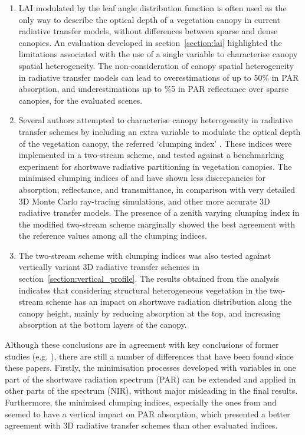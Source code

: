\documentclass[a4paper,11pt]{report}
\begin{document}
\begin{enumerate}
\item LAI modulated by the leaf angle distribution function is often used as the only way to describe the optical depth of a vegetation canopy in current radiative transfer models, without differences between sparse and dense canopies. An evaluation developed in section~\ref{section:lai} highlighted the limitations associated with the use of a single variable to characterise canopy spatial heterogeneity. The non-consideration of canopy spatial heterogeneity in radiative transfer models can lead to overestimations of up to 50\% in PAR absorption, and underestimations up to \%5 in PAR reflectance over sparse canopies, for the evaluated scenes.
\item Several authors attempted to characterise canopy heterogeneity in radiative transfer schemes by including an extra variable to modulate the optical depth of the vegetation canopy, the referred `clumping index' \citep{Nilson1971,Kucharik1999,pinty2006,Ni-Meister2010}. These indices were implemented in a two-stream scheme, and tested against a benchmarking experiment for shortwave radiative partitioning in vegetation canopies. The minimised clumping indices of \citet{Nilson1971} and \citet{pinty2006} have shown less discrepancies for absorption, reflectance, and transmittance, in comparison with very detailed 3D Monte Carlo ray-tracing simulations, and other more accurate 3D radiative transfer models. The presence of a zenith varying clumping index in the modified two-stream scheme marginally showed the best agreement with the reference values among all the clumping indices.
\item The two-stream scheme with clumping indices was also tested against vertically variant 3D radiative transfer schemes in section~\ref{section:vertical_profile}. The results obtained from the analysis indicates that considering structural heterogeneous vegetation in the two-stream scheme has an impact on shortwave radiation distribution along the canopy height, mainly by reducing absorption at the top, and increasing absorption at the bottom layers of the canopy.
\end{enumerate} 

Although these conclusions are in agreement with key conclusions of former studies (e.g. \citet{pinty2006,loew2014}), there are still a number of differences that have been found since these papers. Firstly, the minimisation processes developed with variables in one part of the shortwave radiation spectrum (PAR) can be extended and applied in other parts of the spectrum (NIR), without major misleading in the final results. Furthermore, the minimised clumping indices, especially the ones from \citet{Nilson1971} and \citet{pinty2006} seemed to have a vertical impact on PAR absorption, which presented a better agreement with 3D radiative transfer schemes than other evaluated indices. 
\end{document}
